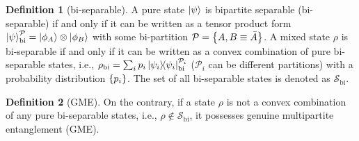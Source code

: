 \documentclass[
aps,
pra,
twocolumn,
floatfix,
]{revtex4-2}
\theoremstyle{plain}
\theoremstyle{definition}
\newtheorem{definition}{Definition}
\newcommand{\dm}{\rho}
\newcommand{\bi}{\text{bi}}
\newcommand{\separableset}{\mathcal{S}}
\newcommand{\ppartition}{\mathcal{P}}
\begin{document}
\begin{definition}[bi-separable]\label{def:bipartite_separable}
	A pure state $\ket{\psi}$ is bipartite separable (bi-separable) if and only if it can be written as a tensor product form 
	$\ket{\psi}_{\bi}^{\ppartition} = \ket{\phi_{A}}\otimes\ket{\phi_{B}}$ with some bi-partition $\ppartition=\qty{A,B\equiv \bar{A}}$. 
	A mixed state $\dm$ is bi-separable if and only if it can be written as a convex combination of pure bi-separable states, i.e.,
	$\dm_{\bi}=\sum_i p_i \op{\psi_i}_\bi^{\ppartition_i}$ 
	($\ppartition_i$ can be different partitions)
	with a probability distribution $\qty{p_i}$.
	The set of all bi-separable states is denoted as $\separableset_\bi$.
\end{definition}
\begin{definition}[GME]\label{def:gme}
	On the contrary, if a state $\dm$ is not a convex combination of any pure bi-separable states,
	i.e., $\dm\notin \separableset_\bi$,
	it possesses genuine multipartite entanglement (GME).
\end{definition}
\end{document}
